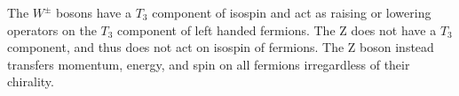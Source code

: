 			The $W^\pm$ bosons have a $T_3$ component of isospin and act as raising or lowering operators on the $T_3$ component of left handed fermions. The Z does not have a $T_3$ component, and thus does not act on isospin of fermions. The Z boson instead transfers momentum, energy, and spin on all fermions irregardless of their chirality. 

